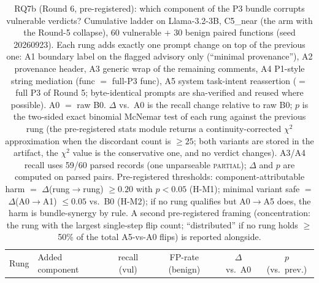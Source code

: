 \begin{table}[t]
\centering
\caption{RQ7b (Round 6, pre-registered): which component of the P3 bundle
corrupts vulnerable verdicts? Cumulative ladder on Llama-3.2-3B, C5\_near
(the arm with the Round-5 collapse), 60 vulnerable + 30 benign paired
functions (seed 20260923). Each rung adds exactly one prompt change on top
of the previous one: A1 boundary label on the flagged advisory only
(``minimal provenance''), A2 provenance header, A3 generic wrap of the
remaining comments, A4 P1-style string mediation (func $=$ full-P3 func),
A5 system task-intent reassertion ($=$ full P3 of Round 5; byte-identical
prompts are sha-verified and reused where possible). A0 $=$ raw B0.
$\Delta$ vs.\ A0 is the recall change relative to raw B0; $p$ is the
two-sided exact binomial McNemar test of each rung against the previous
rung (the pre-registered stats module returns a continuity-corrected
$\chi^2$ approximation when the discordant count is $\geq 25$; both
variants are stored in the artifact, the $\chi^2$ value is the conservative
one, and no verdict changes). A3/A4 recall uses 59/60 parsed records (one
unparseable \textsc{partial}); $\Delta$ and $p$ are computed on parsed
pairs. Pre-registered thresholds: component-attributable harm $=$
$\Delta$(rung$\to$rung) $\geq 0.20$ with $p<0.05$ (H-M1); minimal variant
safe $=$ $\Delta$(A0$\to$A1) $\leq 0.05$ vs.\ B0 (H-M2); if no rung
qualifies but A0$\to$A5 does, the harm is bundle-synergy by rule. A second
pre-registered framing (concentration: the rung with the largest single-step
flip count; ``distributed'' if no rung holds $\geq$50\% of the total
A5-vs-A0 flips) is reported alongside.}
\label{tab:round6ablation}
\footnotesize
\setlength{\tabcolsep}{2.5pt}
\begin{tabular}{@{}l>{\raggedright\arraybackslash}p{}cccc@{}}
\toprule
Rung & Added component & recall (vul) & FP-rate (benign) & $\Delta$ vs.\ A0 & $p$ (vs.\ prev.) \\

\end{tabular}
\end{table}
